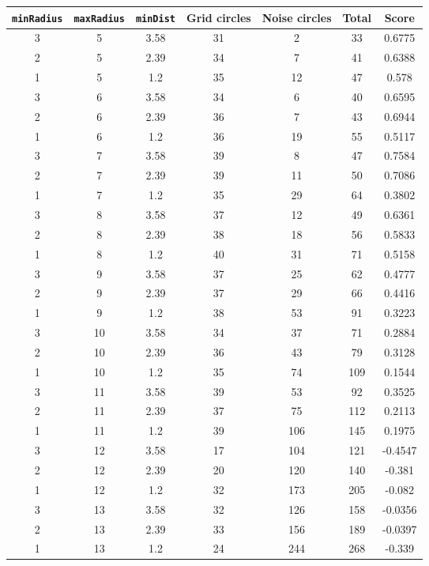 \documentclass[letterpaper, 12pt]{article}
\begin{document}
\begin{longtable}{|c|c|c|c|c|c|c|}
\hline
\textbf{\texttt{minRadius}} & \textbf{\texttt{maxRadius}} & \textbf{\texttt{minDist}} & \textbf{Grid circles} & \textbf{Noise circles} & \textbf{Total} & \textbf{Score} \\
\hline
3 & 5 & 3.58 & 31 & 2 & 33 & 0.6775 \\
\hline
2 & 5 & 2.39 & 34 & 7 & 41 & 0.6388 \\
\hline
1 & 5 & 1.2 & 35 & 12 & 47 & 0.578 \\
\hline
3 & 6 & 3.58 & 34 & 6 & 40 & 0.6595 \\
\hline
2 & 6 & 2.39 & 36 & 7 & 43 & 0.6944 \\
\hline
1 & 6 & 1.2 & 36 & 19 & 55 & 0.5117 \\
\hline
3 & 7 & 3.58 & 39 & 8 & 47 & 0.7584 \\
\hline
2 & 7 & 2.39 & 39 & 11 & 50 & 0.7086 \\
\hline
1 & 7 & 1.2 & 35 & 29 & 64 & 0.3802 \\
\hline
3 & 8 & 3.58 & 37 & 12 & 49 & 0.6361 \\
\hline
2 & 8 & 2.39 & 38 & 18 & 56 & 0.5833 \\
\hline
1 & 8 & 1.2 & 40 & 31 & 71 & 0.5158 \\
\hline
3 & 9 & 3.58 & 37 & 25 & 62 & 0.4777 \\
\hline
2 & 9 & 2.39 & 37 & 29 & 66 & 0.4416 \\
\hline
1 & 9 & 1.2 & 38 & 53 & 91 & 0.3223 \\
\hline
3 & 10 & 3.58 & 34 & 37 & 71 & 0.2884 \\
\hline
2 & 10 & 2.39 & 36 & 43 & 79 & 0.3128 \\
\hline
1 & 10 & 1.2 & 35 & 74 & 109 & 0.1544 \\
\hline
3 & 11 & 3.58 & 39 & 53 & 92 & 0.3525 \\
\hline
2 & 11 & 2.39 & 37 & 75 & 112 & 0.2113 \\
\hline
1 & 11 & 1.2 & 39 & 106 & 145 & 0.1975 \\
\hline
3 & 12 & 3.58 & 17 & 104 & 121 & -0.4547 \\
\hline
2 & 12 & 2.39 & 20 & 120 & 140 & -0.381 \\
\hline
1 & 12 & 1.2 & 32 & 173 & 205 & -0.082 \\
\hline
3 & 13 & 3.58 & 32 & 126 & 158 & -0.0356 \\
\hline
2 & 13 & 2.39 & 33 & 156 & 189 & -0.0397 \\
\hline
1 & 13 & 1.2 & 24 & 244 & 268 & -0.339 \\

\end{longtable}
\end{document}
